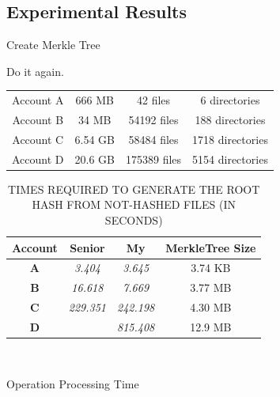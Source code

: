 \documentclass{beamer}
\begin{document}
\begin{CJK}{UTF8}{bkai}
\section{Experimental Results}
\begin{frame}{Create Merkle Tree}
	\begin{center}
	Do it again.\\
	\begin{tabu}{cccc}
	\rowfont{\color{blue} \scriptsize} {Account A} & {666 MB}  & {42 files}     & {6 directories}    \\
	\rowfont{\color{blue} \scriptsize} {Account B} & {34 MB}   & {54192 files}  & {188 directories}  \\
	\rowfont{\color{blue} \scriptsize} {Account C} & {6.54 GB} & {58484 files}  & {1718 directories} \\
	\rowfont{\color{blue} \scriptsize} {Account D} & {20.6 GB} & {175389 files} & {5154 directories} \\
	\end{tabu}
	\end{center}
	\begin{table}[]
	\centering
	\captionsetup{justification=centering}
	\caption{\tiny TIMES REQUIRED TO GENERATE THE ROOT HASH FROM NOT-HASHED FILES (IN SECONDS)}
	\begin{tabular}{|c|c|c|c|}
	\hline
	{\bf Account} & {\bf Senior}  & {\bf My}      & {\bf MerkleTree Size} \\ \hline
	{\bf A}       & {\it 3.404}   & {\it 3.645}   & {3.74 KB}             \\ \hline
	{\bf B}       & {\it 16.618}  & {\it 7.669}   & {3.77 MB}             \\ \hline
	{\bf C}       & {\it 229.351} & {\it 242.198} & {4.30 MB}             \\ \hline
	{\bf D}       & {\it }        & {\it 815.408} & {12.9 MB}             \\ \hline
	\end{tabular}\\
	\end{table}
\end{frame}
\begin{frame}{Operation Processing Time}
	\begin{table}[]
\end{table}
\end{frame}
\end{CJK}
\end{document}
